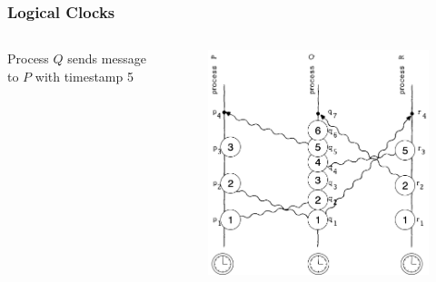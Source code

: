 \documentclass{beamer}
\begin{document}
\frame
{
	\frametitle{Logical Clocks}

	\begin{columns}
	\begin{column}{0.6\textwidth}

		Process $Q$ sends message to $P$ with timestamp 5


	\end{column}
	\begin{column}{0.4\textwidth}

		\begin{figure}[ht!]
		\includegraphics[width=\textwidth]{files/ClockDist-Impl-Logical-Clock-5.png}
		\end{figure}


	\end{column}
	\end{columns}


}
\end{document}
